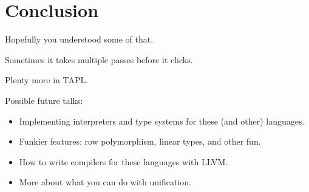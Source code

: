 
\section{Conclusion}

\begin{frame}
  Hopefully you understood some of that.
\end{frame}

\begin{frame}
  Sometimes it takes multiple passes before it clicks.
\end{frame}

\begin{frame}
  Plenty more in TAPL.
\end{frame}

\begin{frame}
  Possible future talks:
  \begin{itemize}
    \pause
  \item <+-> Implementing interpreters and type systems for these (and other) languages.
  \item <+-> Funkier features: row polymorphism, linear types, and other fun.
  \item <+-> How to write compilers for these languages with LLVM.
  \item <+-> More about what you can do with unification.
  \end{itemize}
\end{frame}